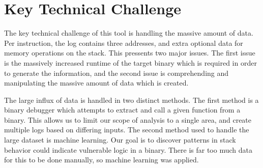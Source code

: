 \documentclass{article}
\begin{document}
\section{Key Technical Challenge}

The key technical challenge of this tool is handling the massive amount of data.  Per instruction, the log contains
three addresses, and extra optional data for memory operations on the stack. This pressents two major issues. The first
issue is the massively increased runtime of the target binary which is required in order to generate the information,
and the second issue is comprehending and manipulating the massive amount of data which is created.

The large influx of data is handled in two distinct methods. The first method is a binary debugger which attempts to
extract and call a given function from a binary. This allows us to limit our scope of analysis to a single area, and
create multiple logs based on differing inputs. The second method used to handle the large dataset is machine learning.
Our goal is to discover patterns in stack behavior could indicate vulnerable logic in a binary. There is far too much
data for this to be done manually, so machine learning was applied.
\end{document}
